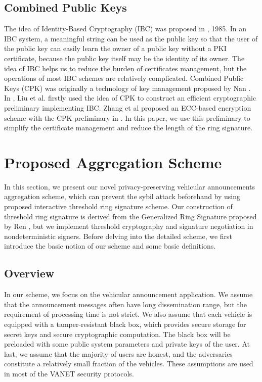 \documentclass[a4paper]{article}
\begin{document}
\subsection{Combined Public Keys}
The idea of Identity-Based Cryptography (IBC) was proposed in \cite{Sha85}, 1985. In an IBC system, a meaningful string can be used as the public key so that the user of the public key can easily learn the owner of a public key without a PKI certificate, because the public key itself may be the identity of its owner. The idea of IBC helps us to reduce the burden of certificates management, but the operations of most IBC schemes are relatively complicated. Combined Public Keys (CPK) was originally a technology of key management proposed by Nan \cite{Nan06}. In \cite{LZ08}, Liu et al. firstly used the idea of CPK to construct an efficient cryptographic preliminary implementing IBC. Zhang et al proposed an ECC-based encryption scheme with the CPK preliminary in \cite{ZLH10}. In this paper, we use this preliminary to simplify the certificate management and reduce the length of the ring signature.
\section{Proposed Aggregation Scheme}
In this section, we present our novel privacy-preserving vehicular announcements aggregation scheme, which can prevent the sybil attack beforehand by using proposed interactive threshold ring signature scheme. Our construction of threshold ring signature is derived from the Generalized Ring Signature proposed by Ren \cite{RH08}, but we implement threshold cryptography and signature negotiation in nondeterministic signers. Before delving into the detailed scheme, we first introduce the basic notion of our scheme and some basic definitions.
\subsection{Overview}
In our scheme, we focus on the vehicular announcement application. We assume that the announcement messages often have long dissemination range, but the requirement of processing time is not strict. We also assume that each vehicle is equipped with a tamper-resistant black box, which provides secure storage for secret keys and secure cryptographic computation. The black box will be preloaded with some public system parameters and private keys of the user. At last, we assume that the majority of users are honest, and the adversaries constitute a relatively small fraction of the vehicles. These assumptions are used in most of the VANET security protocols.
\end{document}
